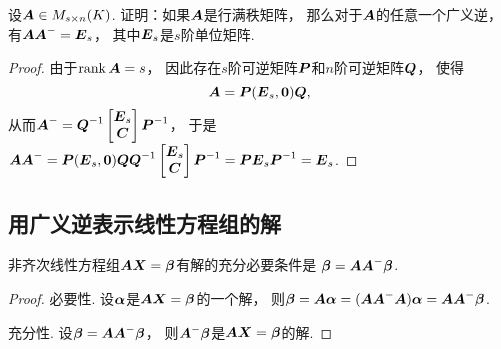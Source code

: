 \begin{example}
设\(\boldsymbol{A} \in M_{s \times n}(K)\).
证明：如果\(\boldsymbol{A}\)是行满秩矩阵，
那么对于\(\boldsymbol{A}\)的任意一个广义逆，
有\(\boldsymbol{A} \boldsymbol{A}^- = \boldsymbol{E}_s\)，
其中\(\boldsymbol{E}_s\)是\(s\)阶单位矩阵.
\begin{proof}
由于\(\rank\boldsymbol{A} = s\)，
因此存在\(s\)阶可逆矩阵\(\boldsymbol{P}\)和\(n\)阶可逆矩阵\(\boldsymbol{Q}\)，
使得\begin{equation*}
	\boldsymbol{A} = \boldsymbol{P} (\boldsymbol{E}_s,\boldsymbol0) \boldsymbol{Q},
\end{equation*}
从而\(
	\boldsymbol{A}^-
	= \boldsymbol{Q}^{-1}
	\begin{bmatrix}
		\boldsymbol{E}_s \\
		\boldsymbol{C}
	\end{bmatrix}
	\boldsymbol{P}^{-1}
\)，
于是\(
	\boldsymbol{A} \boldsymbol{A}^-
	= \boldsymbol{P}
	(\boldsymbol{E}_s,\boldsymbol0)
	\boldsymbol{Q}
	\boldsymbol{Q}^{-1}
	\begin{bmatrix}
		\boldsymbol{E}_s \\
		\boldsymbol{C}
	\end{bmatrix}
	\boldsymbol{P}^{-1}
	= \boldsymbol{P} \boldsymbol{E}_s \boldsymbol{P}^{-1}
	= \boldsymbol{E}_s
\).
\end{proof}
\end{example}

\subsection{用广义逆表示线性方程组的解}
\begin{theorem}[非齐次线性方程组的相容性定理]\label{theorem:线性方程组.非齐次线性方程组的相容性定理}
非齐次线性方程组\(\boldsymbol{A} \boldsymbol{X} = \boldsymbol\beta\)有解的充分必要条件是
\(\boldsymbol\beta = \boldsymbol{A} \boldsymbol{A}^- \boldsymbol\beta\).
\begin{proof}
必要性.
设\(\boldsymbol\alpha\)是\(\boldsymbol{A} \boldsymbol{X} = \boldsymbol\beta\)的一个解，
则\(
	\boldsymbol\beta
	= \boldsymbol{A} \boldsymbol\alpha
	= (\boldsymbol{A} \boldsymbol{A}^- \boldsymbol{A}) \boldsymbol\alpha
	= \boldsymbol{A} \boldsymbol{A}^- \boldsymbol\beta
\).

充分性.
设\(\boldsymbol\beta = \boldsymbol{A} \boldsymbol{A}^- \boldsymbol\beta\)，
则\(\boldsymbol{A}^- \boldsymbol\beta\)是\(\boldsymbol{A} \boldsymbol{X} = \boldsymbol\beta\)的解.
\end{proof}
\end{theorem}

